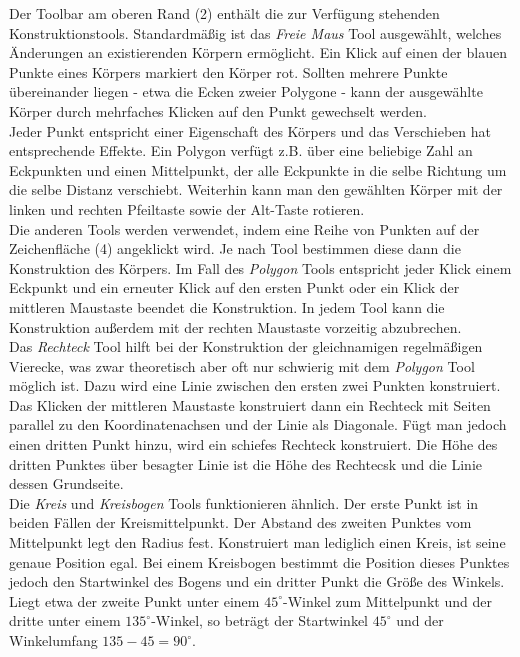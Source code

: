 \documentclass[reducespace,stylepage,semiarbeit]{spezidoc}
\begin{document}
Der Toolbar am oberen Rand (2) enthält die zur Verfügung stehenden Konstruktionstools. 
Standardmäßig ist das \textit{Freie Maus} Tool ausgewählt, welches Änderungen an existierenden Körpern ermöglicht.
Ein Klick auf einen der blauen Punkte eines Körpers markiert den Körper rot.
Sollten mehrere Punkte übereinander liegen - etwa die Ecken zweier Polygone - kann der ausgewählte Körper durch mehrfaches Klicken auf den Punkt gewechselt werden.\\
Jeder Punkt entspricht einer Eigenschaft des Körpers und das Verschieben hat entsprechende Effekte.
Ein Polygon verfügt z.B. über eine beliebige Zahl an Eckpunkten und einen Mittelpunkt, der alle Eckpunkte in die selbe Richtung um die selbe Distanz verschiebt.
Weiterhin kann man den gewählten Körper mit der linken und rechten Pfeiltaste sowie der Alt-Taste rotieren.\\
Die anderen Tools werden verwendet, indem eine Reihe von Punkten auf der Zeichenfläche (4) angeklickt wird.
Je nach Tool bestimmen diese dann die Konstruktion des Körpers.
Im Fall des \textit{Polygon} Tools entspricht jeder Klick einem Eckpunkt und ein erneuter Klick auf den ersten Punkt oder ein Klick der mittleren Maustaste beendet die Konstruktion.
In jedem Tool kann die Konstruktion außerdem mit der rechten Maustaste vorzeitig abzubrechen. \\
Das \textit{Rechteck} Tool hilft bei der Konstruktion der gleichnamigen regelmäßigen Vierecke, was zwar theoretisch aber oft nur schwierig mit dem \textit{Polygon} Tool möglich ist. 
Dazu wird eine Linie zwischen den ersten zwei Punkten konstruiert. 
Das Klicken der mittleren Maustaste konstruiert dann ein Rechteck mit Seiten parallel zu den Koordinatenachsen und der Linie als Diagonale. 
Fügt man jedoch einen dritten Punkt hinzu, wird ein schiefes Rechteck konstruiert.
Die Höhe des dritten Punktes über besagter Linie ist die Höhe des Rechtecsk und die Linie dessen Grundseite.\\
Die \textit{Kreis} und \textit{Kreisbogen} Tools funktionieren ähnlich.
Der erste Punkt ist in beiden Fällen der Kreismittelpunkt.
Der Abstand des zweiten Punktes vom Mittelpunkt legt den Radius fest.
Konstruiert man lediglich einen Kreis, ist seine genaue Position egal.
Bei einem Kreisbogen bestimmt die Position dieses Punktes jedoch den Startwinkel des Bogens und ein dritter Punkt die Größe des Winkels.
Liegt etwa der zweite Punkt unter einem $45^{\circ}$-Winkel zum Mittelpunkt und der dritte unter einem $135^{\circ}$-Winkel, so beträgt der Startwinkel $45^{\circ}$ und der Winkelumfang $135-45=90^{\circ}$. \\
\end{document}
